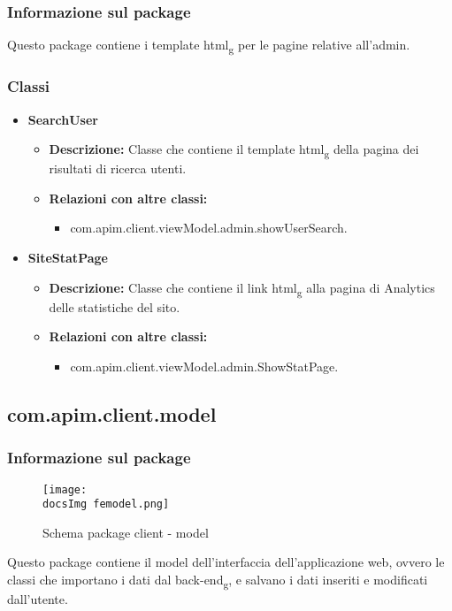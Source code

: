 {{		\subsubsection{Informazione sul package}{
			Questo package contiene i template html\textsubscript{g} per le pagine relative all'admin.
		}
		\subsubsection{Classi}{
			\begin{itemize}
				\item \textbf{SearchUser}
					\begin{itemize}
						\item \textbf{Descrizione:} Classe che contiene il template html\textsubscript{g} della pagina dei risultati di ricerca utenti.
						\item \textbf{Relazioni con altre classi:}
						\begin{itemize}
							\item com.apim.client.viewModel.admin.showUserSearch.
						\end{itemize}
					\end{itemize}
				\item \textbf{SiteStatPage}
					\begin{itemize}
						\item \textbf{Descrizione:} Classe che contiene il link html\textsubscript{g} alla pagina di Analytics delle statistiche del sito.
						\item \textbf{Relazioni con altre classi:}
						\begin{itemize}
							\item com.apim.client.viewModel.admin.ShowStatPage.
						\end{itemize}
					\end{itemize}	
			\end{itemize}
		}
	}
	\subsection{com.apim.client.model}{
		\subsubsection{Informazione sul package}{
			\begin{figure}[H]
				\centering
				\texttt{[image: \\docsImg femodel.png]}
				\caption{Schema package client - model}
			\end{figure}
		Questo package contiene il model dell'interfaccia dell'applicazione web, ovvero le classi che importano i dati dal back-end\textsubscript{g}, e salvano i dati inseriti e modificati dall'utente.
		}
}}
